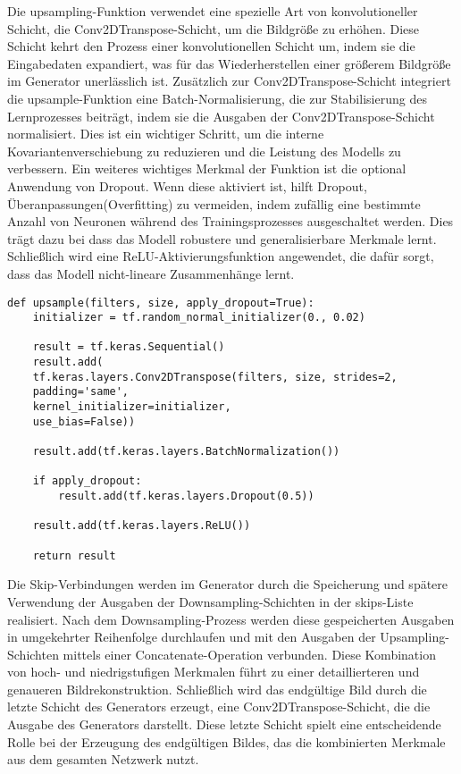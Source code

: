 Die upsampling-Funktion verwendet eine spezielle Art von  konvolutioneller Schicht, die Conv2DTranspose-Schicht, um die Bildgröße zu erhöhen. Diese Schicht kehrt den Prozess einer konvolutionellen Schicht um, indem sie die Eingabedaten expandiert, was für das Wiederherstellen einer größerem Bildgröße im Generator unerlässlich ist. Zusätzlich zur Conv2DTranspose-Schicht integriert die upsample-Funktion eine Batch-Normalisierung, die zur Stabilisierung des Lernprozesses beiträgt, indem sie die Ausgaben der Conv2DTranspose-Schicht normalisiert. Dies ist ein wichtiger Schritt, um die interne Kovariantenverschiebung zu reduzieren und die Leistung des Modells zu verbessern. Ein weiteres wichtiges Merkmal der Funktion ist die optional Anwendung von Dropout. Wenn diese aktiviert ist, hilft Dropout, Überanpassungen(Overfitting) zu vermeiden, indem zufällig eine bestimmte Anzahl von Neuronen während des Trainingsprozesses ausgeschaltet werden. Dies trägt dazu bei dass das Modell robustere und generalisierbare Merkmale lernt. Schließlich wird eine ReLU-Aktivierungsfunktion angewendet, die dafür sorgt, dass das Modell nicht-lineare Zusammenhänge lernt. 
\newpage
\begin{lstlisting}[language=pyhaff, caption={Upsampling-Schritt}, label={cod:Pix2PixGAN Generator}]
	def upsample(filters, size, apply_dropout=True):
	initializer = tf.random_normal_initializer(0., 0.02)
	
	result = tf.keras.Sequential()
	result.add(
	tf.keras.layers.Conv2DTranspose(filters, size, strides=2,
	padding='same',
	kernel_initializer=initializer,
	use_bias=False))
	
	result.add(tf.keras.layers.BatchNormalization())
	
	if apply_dropout:
		result.add(tf.keras.layers.Dropout(0.5))
	
	result.add(tf.keras.layers.ReLU())
	
	return result
\end{lstlisting} 
Die Skip-Verbindungen werden im Generator durch die Speicherung und spätere Verwendung der Ausgaben der Downsampling-Schichten in der skips-Liste realisiert. Nach dem Downsampling-Prozess werden diese gespeicherten Ausgaben in umgekehrter Reihenfolge durchlaufen und mit den Ausgaben der Upsampling-Schichten mittels einer Concatenate-Operation verbunden. Diese Kombination von hoch- und niedrigstufigen Merkmalen führt zu einer detaillierteren und genaueren Bildrekonstruktion.
\newline
Schließlich wird das endgültige Bild durch die letzte Schicht des Generators erzeugt, eine Conv2DTranspose-Schicht, die die Ausgabe des Generators darstellt. Diese letzte Schicht spielt eine entscheidende Rolle bei der Erzeugung des endgültigen Bildes, das die kombinierten Merkmale aus dem gesamten Netzwerk nutzt.
